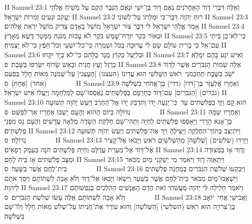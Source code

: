 II Samuel 23:1	וְאֵלֶּה דִּבְרֵי דָוִד הָאַחֲרֹנִים נְאֻם דָּוִד בֶּן־יִשַׁי וּנְאֻם הַגֶּבֶר הֻקַם עָל מְשִׁיחַ אֱלֹהֵי יַעֲקֹב וּנְעִים זְמִרוֹת יִשְׂרָאֵל׃
II Samuel 23:2	רוּחַ יְהֹוָה דִּבֶּר־בִּי וּמִלָּתוֹ עַל־לְשׁוֹנִי׃
II Samuel 23:3	אָמַר אֱלֹהֵי יִשְׂרָאֵל לִי דִבֶּר צוּר יִשְׂרָאֵל מוֹשֵׁל בָּאָדָם צַדִּיק מוֹשֵׁל יִרְאַת אֱלֹהִים׃
II Samuel 23:4	וּכְאוֹר בֹּקֶר יִזְרַח־שָׁמֶשׁ בֹּקֶר לֹא עָבוֹת מִנֹּגַהּ מִמָּטָר דֶּשֶׁא מֵאָרֶץ׃
II Samuel 23:5	כִּי־לֹא־כֵן בֵּיתִי עִם־אֵל כִּי בְרִית עוֹלָם שָׂם לִי עֲרוּכָה בַכֹּל וּשְׁמֻרָה כִּי־כל־יִשְׁעִי וְכל־חֵפֶץ כִּי־לֹא יַצְמִיחַ׃
II Samuel 23:6	וּבְלִיַּעַל כְּקוֹץ מֻנָד כֻּלָּהַם כִּי־לֹא בְיָד יִקָּחוּ׃
II Samuel 23:7	וְאִישׁ יִגַּע בָּהֶם יִמָּלֵא בַרְזֶל וְעֵץ חֲנִית וּבָאֵשׁ שָׂרוֹף יִשָּׂרְפוּ בַּשָּׁבֶת׃ {פ}
II Samuel 23:8	אֵלֶּה שְׁמוֹת הַגִּבֹּרִים אֲשֶׁר לְדָוִד יֹשֵׁב בַּשֶּׁבֶת תַּחְכְּמֹנִי  רֹאשׁ הַשָּׁלִשִׁי הוּא עֲדִינוֹ (העצנו) [הָעֶצְנִי] עַל־שְׁמֹנֶה מֵאוֹת חָלָל בְּפַעַם (אחד) [אֶחָת]׃ {ס}        
II Samuel 23:9	וְאַחֲרָו אֶלְעָזָר בֶּן־[דֹּדוֹ] (דדי) בֶּן־אֲחֹחִי בִּשְׁלֹשָׁה (גברים) [הַגִּבֹּרִים] עִם־דָּוִד בְּחָרְפָם בַּפְּלִשְׁתִּים נֶאֶסְפוּ־שָׁם לַמִּלְחָמָה וַיַּעֲלוּ אִישׁ יִשְׂרָאֵל׃
II Samuel 23:10	הוּא קָם וַיַּךְ בַּפְּלִשְׁתִּים עַד  כִּי־יָגְעָה יָדוֹ וַתִּדְבַּק יָדוֹ אֶל־הַחֶרֶב וַיַּעַשׂ יְהֹוָה תְּשׁוּעָה גְדוֹלָה בַּיּוֹם הַהוּא וְהָעָם יָשֻׁבוּ אַחֲרָיו אַךְ־לְפַשֵּׁט׃ {ס}        
II Samuel 23:11	וְאַחֲרָיו שַׁמָּה בֶן־אָגֵא הָרָרִי וַיֵּאָסְפוּ פְלִשְׁתִּים לַחַיָּה וַתְּהִי־שָׁם חֶלְקַת הַשָּׂדֶה מְלֵאָה עֲדָשִׁים וְהָעָם נָס מִפְּנֵי פְלִשְׁתִּים׃
II Samuel 23:12	וַיִּתְיַצֵּב בְּתוֹךְ־הַחֶלְקָה וַיַּצִּילֶהָ וַיַּךְ אֶת־פְּלִשְׁתִּים וַיַּעַשׂ יְהֹוָה תְּשׁוּעָה גְדוֹלָה׃ {ס}        
II Samuel 23:13	וַיֵּרְדוּ (שלשים) [שְׁלֹשָׁה] מֵהַשְּׁלֹשִׁים רֹאשׁ וַיָּבֹאוּ אֶל־קָצִיר אֶל־דָּוִד אֶל־מְעָרַת עֲדֻלָּם וְחַיַּת פְּלִשְׁתִּים חֹנָה בְּעֵמֶק רְפָאִים׃
II Samuel 23:14	וְדָוִד אָז בַּמְּצוּדָה וּמַצַּב פְּלִשְׁתִּים אָז בֵּית לָחֶם׃
II Samuel 23:15	וַיִּתְאַוֶּה דָוִד וַיֹּאמַר מִי יַשְׁקֵנִי מַיִם מִבֹּאר בֵּית־לֶחֶם אֲשֶׁר בַּשָּׁעַר׃ {ס}        
II Samuel 23:16	וַיִּבְקְעוּ שְׁלֹשֶׁת הַגִּבֹּרִים בְּמַחֲנֵה פְלִשְׁתִּים וַיִּשְׁאֲבוּ־מַיִם מִבֹּאר בֵּית־לֶחֶם אֲשֶׁר בַּשַּׁעַר וַיִּשְׂאוּ וַיָּבִאוּ אֶל־דָּוִד וְלֹא אָבָה לִשְׁתּוֹתָם וַיַּסֵּךְ אֹתָם לַיהֹוָה׃
II Samuel 23:17	וַיֹּאמֶר חָלִילָה לִּי יְהֹוָה מֵעֲשֹׂתִי זֹאת הֲדַם הָאֲנָשִׁים הַהֹלְכִים בְּנַפְשׁוֹתָם וְלֹא אָבָה לִשְׁתּוֹתָם אֵלֶּה עָשׂוּ שְׁלֹשֶׁת הַגִּבֹּרִים׃ {ס}        
II Samuel 23:18	וַאֲבִישַׁי אֲחִי  יוֹאָב בֶּן־צְרוּיָה הוּא רֹאשׁ (השלשי) [הַשְּׁלֹשָׁה] וְהוּא עוֹרֵר אֶת־חֲנִיתוֹ עַל־שְׁלֹשׁ מֵאוֹת חָלָל וְלוֹ־שֵׁם בַּשְּׁלֹשָׁה׃
